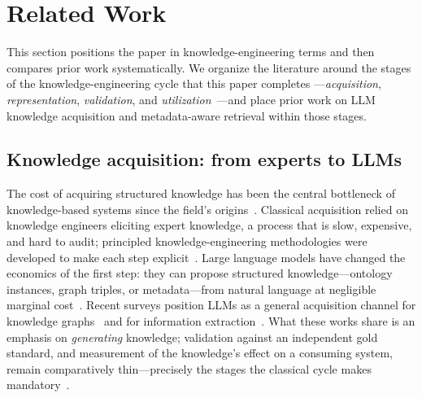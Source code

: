 
\section{Related Work}
\label{sec:rel}

This section positions the paper in knowledge-engineering terms and then
compares prior work systematically. We organize the literature around the
stages of the knowledge-engineering cycle that this paper completes
---\textit{acquisition}, \textit{representation}, \textit{validation}, and
\textit{utilization}~\cite{studer_knowledge_engineering}---and place prior
work on LLM knowledge acquisition and metadata-aware retrieval within those
stages.

\subsection{Knowledge acquisition: from experts to LLMs}

The cost of acquiring structured knowledge has been the central bottleneck
of knowledge-based systems since the field's
origins~\cite{feigenbaum_knowledge_engineering}. Classical acquisition
relied on knowledge engineers eliciting expert knowledge, a process that is
slow, expensive, and hard to audit; principled knowledge-engineering
methodologies were developed to make each step
explicit~\cite{studer_knowledge_engineering}. Large language models
have changed the economics of the first step: they can propose structured
knowledge---ontology instances, graph triples, or metadata---from natural
language at negligible marginal cost~\cite{ciatto_llm_oracle_kbs,
pan_llm_kg_roadmap, xu_llm_gen_ie}. Recent surveys position LLMs as a
general acquisition channel for knowledge
graphs~\cite{ji_kg_survey, pan_llm_kg_roadmap} and for information
extraction~\cite{xu_llm_gen_ie}. What these works share is an emphasis on
\textit{generating} knowledge; validation against an independent gold
standard, and measurement of the knowledge's effect on a consuming system,
remain comparatively thin---precisely the stages the classical cycle makes
mandatory~\cite{studer_knowledge_engineering,
okeefe_kbs_validation}.

